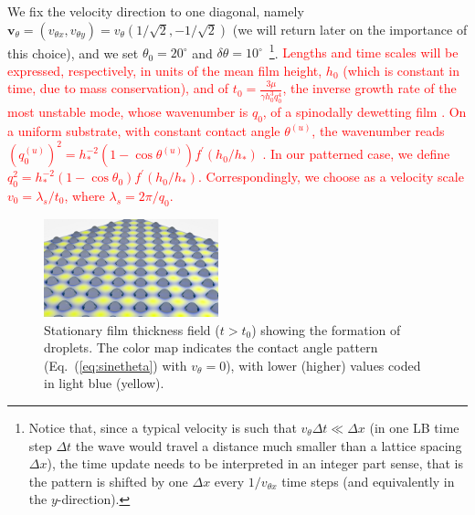 \documentclass[twocolumn,amsmath,amssymb,showpacs,prl,superscriptaddress]{revtex4-1} %
\begin{document}
We fix the velocity direction to one diagonal, namely $\mathbf{v}_{\theta} = (v_{\theta x},v_{\theta y}) = v_{\theta}(1/\sqrt{2},-1/\sqrt{2})$ (we will return later on the importance of this choice), and we set $\theta_0 = 20^{\circ}$ and $\delta\theta=10^{\circ}$~\footnote{Notice that, since a typical velocity is such that $v_{\theta} \Delta t \ll \Delta x$ (in one LB time step $\Delta t$ the wave would travel a distance much smaller than a lattice spacing $\Delta x$),
the time update needs to be interpreted in an integer part sense, that is the pattern is shifted by one $\Delta x$ every $1/v_{\theta x}$ time steps (and equivalently in the $y$-direction).}.
\textcolor{red}{Lengths and time scales will be expressed, respectively, in units of the mean film height, $h_0$ (which is constant in time, due to mass conservation), and of $t_0 = \frac{3\mu}{\gamma h_0^3 q_0^4}$, the inverse growth rate of the most unstable mode, whose wavenumber is $q_0$, of a spinodally dewetting film \cite{Mecke_2005}. On a uniform substrate, with constant contact angle $\theta^{(u)}$, the wavenumber reads 
$(q^{(u)}_0)^2 = h_{\ast}^{-2}(1-\cos \theta^{(u)})f^{\prime}(h_0/h_{\ast})$ \cite{Mecke_2005,PhysRevE.100.023108}. In our patterned case, we define 
  $q_0^2=h_{\ast}^{-2}(1-\cos\theta_0)f^{\prime}(h_0/h_{\ast})$. Correspondingly, we choose as a velocity scale $v_0 = \lambda_s/t_0$, where
$\lambda_s = 2\pi/q_0$.}
\begin{figure}
    \centering
    \includegraphics[width=0.45\textwidth]{Figure_1.png}
    \caption{Stationary film thickness field ($t>t_0$) showing the formation of droplets. The color map indicates the contact angle pattern 
    (Eq.~(\ref{eq:sinetheta}) with $v_{\theta}=0$), with lower (higher) values coded in light blue (yellow).
    }
    \label{fig:handtheta}
\end{figure}
\end{document}
